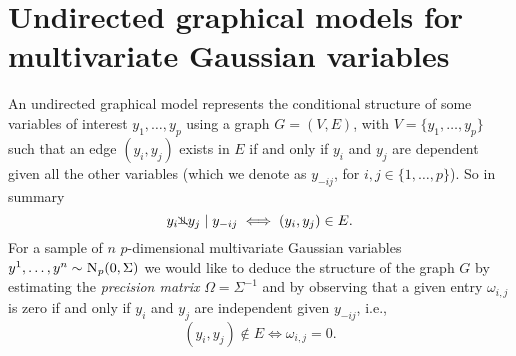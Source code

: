 \documentclass[a4paper, 11pt, oneside]{report}
\newcommand{\1}{\mathds{1}}
\newcommand{\inv}{^{-1}}
\newcommand{\Np}{\textsc{N}_p}
\newcommand{\nindep}{{\rotatebox[origin=c]{90}{$\nvDash$}}}
\begin{document}
\chapter{Undirected graphical models for multivariate Gaussian
  variables}\label{sect:graphs}
An undirected graphical model represents the conditional
structure of some variables of interest $y_1, \dots, y_p$ using a
graph $G=(V, E)$, with $V = \{y_1, \dots, y_p\}$ such that an edge $(y_i, y_j)$
exists in $E$ if and only if $y_i$ and $y_j$ are dependent given all the other
variables (which we denote as $y_{-ij}$, for $i,j \in \{1,\dots,p\}$). So in summary
\[y_i \nindep y_j \mid y_{-ij} \iff (y_i, y_j) \in E.\]
For a sample
of $n$ $p$-dimensional multivariate Gaussian variables $y^1, \dots, y^n \sim
	\Np(0, \Sigma)$ we would like to deduce the structure of the graph $G$ by
estimating the \emph{precision matrix} $\Omega =
	\Sigma\inv$ and by observing that a given entry $\omega_{i,j}$ is zero if and only if $y_i$ and $y_j$ are
independent given $y_{-ij}$, i.e.,
\[(y_i, y_j) \notin E \iff \omega_{i,j} = 0.\]
\end{document}
